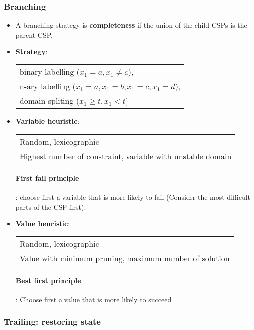 \subsubsection{Branching}

\begin{itemize}
    \item A branching strategy is \textbf{completeness}
        if the union of the child CSPs is the parent CSP.

    \item \textbf{Strategy}: 
        \begin{tabular}{l}
            binary labelling ($x_1=a, x_1 \neq a$),\\
            n-ary labelling ($x_1=a, x_1=b, x_1=c, x_1=d$),\\
            domain spliting ($x_1\geq t, x_1 < t$)
        \end{tabular}

    \item \textbf{Variable heuristic}: 
        \begin{tabular}{l}
            Random, lexicographic \\
            Highest number of constraint, variable with unstable
            domain
        \end{tabular}

        \paragraph{First fail principle}: choose first a variable that
        is more likely to fail (Consider the most difficult parts of the
        CSP first).

    \item \textbf{Value heuristic}:
        \begin{tabular}{l}
            Random, lexicographic\\
            Value with minimum pruning, maximum number of solution\\
        \end{tabular}

        \paragraph{Best first principle}: Choose first a value that is
        more likely to succeed
\end{itemize}

\subsubsection{Trailing: restoring state}

